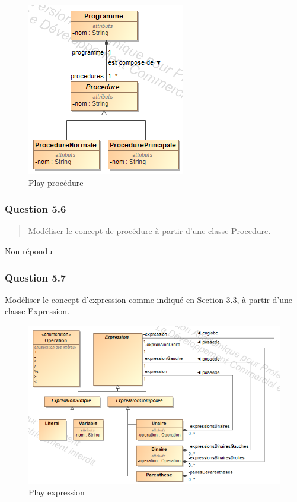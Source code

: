 \documentclass[]{article}
\begin{document}
\begin{figure}
\centering
\includegraphics{./images_final/PlayQ5.png}
\caption{Play procédure}
\end{figure}

\hypertarget{question-5.6}{%
\subsubsection{Question 5.6}\label{question-5.6}}

\begin{quote}
Modéliser le concept de procédure à partir d'une classe Procedure.
\end{quote}

Non répondu

\hypertarget{question-5.7}{%
\subsubsection{Question 5.7}\label{question-5.7}}

Modéliser le concept d'expression comme indiqué en Section 3.3, à partir
d'une classe Expression.

\begin{figure}
\centering
\includegraphics{./images_final/PlayQ7.png}
\caption{Play expression}
\end{figure}
\end{document}
